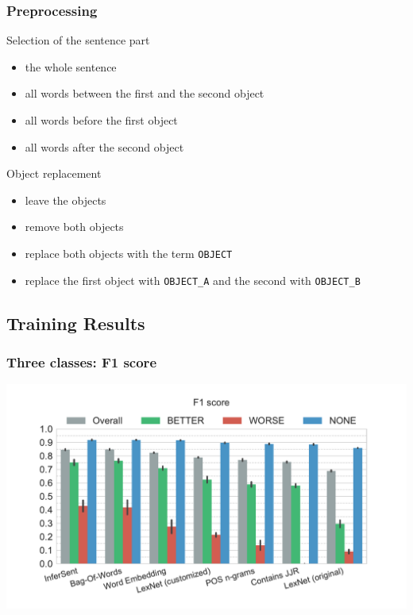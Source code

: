 \documentclass[11pt,aspectratio=169,usenames,dvipsnames]{beamer}
\begin{document}
    \begin{frame}[t]
    \frametitle{Preprocessing}
    Selection of the sentence part
        \begin{itemize}
    \item the whole sentence
    \item all words between the first and the second object
    \item all words before the first object
    \item all words after the second object\pause
    \end{itemize}
    Object replacement
    \begin{itemize}
    \item leave the objects
    \item remove both objects
    \item replace both objects with the term \texttt{OBJECT}
    \item replace the first object with \texttt{OBJECT\_A} and the second with \texttt{OBJECT\_B} 
    \end{itemize}
    


    \end{frame}


    \subsection{Training Results}
    \frame{\subsectionpage}
    \begin{frame}[t]
        \frametitle{Three classes: F1 score}
        \centerline{\includegraphics[scale=0.45,trim={0 0 0 0.5cm},clip]{images/experiments/p-f1-False}}
    \end{frame}
\end{document}
